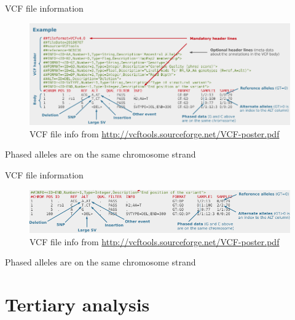 \documentclass[presentation]{beamer}
\begin{document}
\begin{frame}[label=sec-3-1-16]{VCF file information}
\begin{center}

\begin{figure}[htb]
\centering
\includegraphics[width=11.5cm]{DanecekVcfFile.png}
\caption{VCF file info from \url{http://vcftools.sourceforge.net/VCF-poster.pdf}}
\end{figure}

Phased alleles are on the same chromosome strand
 \end{center}
\end{frame}

\begin{frame}[label=sec-3-1-17]{VCF file information}
\begin{center}

\begin{figure}[htb]
\centering
\includegraphics[width=11.5cm]{DanecekVcfFile2.png}
\caption{VCF file info from \url{http://vcftools.sourceforge.net/VCF-poster.pdf}}
\end{figure}

Phased alleles are on the same chromosome strand
 \end{center}
\end{frame}
\section{Tertiary analysis}
\label{sec-4}
\end{document}
